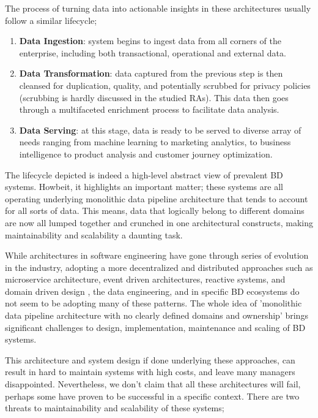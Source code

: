 \documentclass[review]{elsarticle}
\begin{document}
The process of turning data into actionable insights in these architectures usually follow a similar lifecycle;

\begin{enumerate}
    \item \textbf{Data Ingestion}: system begins to ingest data from all corners of the enterprise, including both transactional, operational and external data.
    \item \textbf{Data Transformation}: data captured from the previous step is then cleansed for duplication, quality, and potentially scrubbed for privacy policies (scrubbing is hardly discussed in the studied RAs). This data then goes through a multifaceted enrichment process to facilitate data analysis.
    \item \textbf{Data Serving}: at this stage, data is ready to be served to diverse array of needs ranging from machine learning to marketing analytics, to business intelligence to product analysis and customer journey optimization.
\end{enumerate}

The lifecycle depicted is indeed a high-level abstract view of prevalent BD systems. Howbeit, it highlights an important matter; these systems are all operating underlying monolithic data pipeline architecture that tends to account for all sorts of data. This means, data that logically belong to different domains are now all lumped together and crunched in one architectural constructs, making maintainability and scalability a daunting task.


While architectures in software engineering have gone through series of evolution in the industry, adopting a more decentralized and distributed approaches such as microservice architecture, event driven architectures, reactive systems, and domain driven design , the data engineering, and in specific BD ecosystems do not seem to be adopting many of these patterns. The whole idea of 'monolithic data
pipeline architecture with no clearly defined domains and ownership' brings significant challenges to design, implementation, maintenance and scaling of BD systems.

This architecture and system design if done underlying these approaches, can result in hard to maintain systems with high costs, and leave many managers disappointed.
Nevertheless, we don't claim that all these architectures will fail, perhaps some have proven to be successful in a specific context. There are two threats to maintainability and scalability of these systems; 
\end{document}
